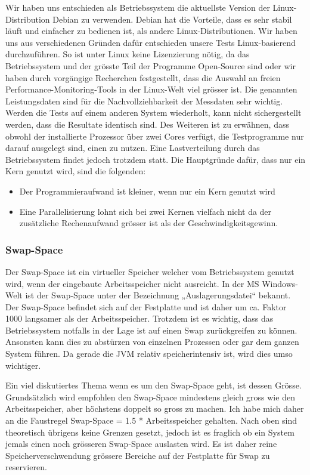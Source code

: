 \documentclass{fancydocument}
\begin{document}
Wir haben uns entschieden als Betriebssystem die aktuellste Version der Linux-Distribution Debian zu verwenden. Debian hat die Vorteile, dass es sehr stabil läuft und einfacher zu bedienen ist, als andere Linux-Distributionen. Wir haben uns aus verschiedenen Gründen dafür entschieden unsere Tests Linux-basierend durchzuführen. So ist unter Linux keine Lizenzierung nötig, da das Betriebssystem und der grösste Teil der Programme Open-Source sind  oder  wir haben durch vorgängige Recherchen festgestellt, dass die Auswahl an freien Performance-Monitoring-Tools in der Linux-Welt viel grösser ist.
Die genannten Leistungsdaten sind für die Nachvollziehbarkeit der Messdaten sehr wichtig. Werden die Tests auf einem anderen System wiederholt, kann nicht sichergestellt werden, dass die Resultate identisch sind. 
Des Weiteren ist zu erwähnen, dass obwohl der installierte Prozessor über zwei Cores verfügt, die Testprogramme nur darauf ausgelegt sind, einen zu nutzen. Eine Lastverteilung durch das Betriebssystem findet jedoch trotzdem statt. Die Hauptgründe dafür, dass nur ein Kern genutzt wird, sind die folgenden:

\begin{itemize}
\item Der Programmieraufwand ist kleiner, wenn nur ein Kern genutzt wird
\item Eine Parallelisierung lohnt sich bei zwei Kernen vielfach nicht da der zusätzliche Rechenaufwand grösser ist als der Geschwindigkeitsgewinn.
\end{itemize}

\subsubsection{Swap-Space}
Der Swap-Space ist ein virtueller Speicher welcher vom Betriebssystem genutzt wird, wenn der eingebaute Arbeitsspeicher nicht ausreicht. In der MS Windows-Welt ist der Swap-Space unter der Bezeichnung „Auslagerungsdatei“ bekannt. Der Swap-Space befindet sich auf der Festplatte und ist daher um ca. Faktor 1000 langsamer als der Arbeitsspeicher. Trotzdem ist es wichtig, dass das Betriebssystem notfalls in der Lage ist auf einen Swap zurückgreifen zu können. Ansonsten kann dies zu abstürzen von einzelnen Prozessen oder gar dem ganzen System führen. Da gerade die JVM relativ speicherintensiv ist, wird dies umso wichtiger.

Ein viel diskutiertes Thema wenn es um den Swap-Space geht, ist dessen Grösse. Grundsätzlich wird empfohlen den Swap-Space mindestens gleich gross wie den Arbeitsspeicher, aber höchstens doppelt so gross zu machen. Ich habe mich daher an die Faustregel Swap-Space = 1.5 * Arbeitsspeicher gehalten. Nach oben sind theoretisch übrigens keine Grenzen gesetzt, jedoch ist es fraglich ob ein System jemals einen noch grösseren Swap-Space auslasten wird. Es ist daher reine Speicherverschwendung grössere Bereiche auf der Festplatte für Swap zu reservieren.
\end{document}

